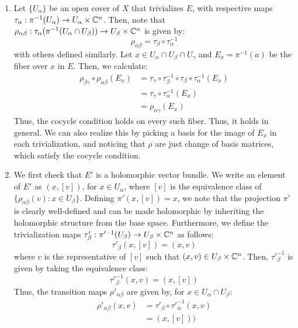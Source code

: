 \documentclass[12pt]{article}
\begin{document}
\begin{solu}
    \bbni
    \begin{enumerate}
        \item Let $\{U_\alpha\}$ be an open cover of $X$ that trivializes $E$, with respective maps $\tau_\alpha: \pi^{-1}(U_\alpha) \to U_\alpha \times \mathbb C^n$. Then, note that $\rho_{\alpha\beta}: \tau_\alpha(\pi^{-1}(U_\alpha \cap U_\beta)) \to U_\beta \times \mathbb C^n$ is given by: 
        \[\rho_{\alpha\beta} = \tau_\beta \circ \tau_\alpha^{-1}  \] 
        with others defined similarly. Let $x \in U_\alpha \cap U_\beta \cap U_\gamma$ and $E_x = \pi^{-1}(a)$ be the fiber over $x$ in $E$. Then, we calculate: 
        \begin{align*}
            \rho_{\beta\gamma} \circ \rho_{\alpha\beta}(E_x) &= \tau_\gamma \circ \tau_\beta^{-1} \circ \tau_\beta \circ \tau_\alpha^{-1}(E_x) \\
            &= \tau_\gamma \circ \tau_\alpha^{-1}(E_x) \\
            &= \rho_{\alpha\gamma}(E_x)
        \end{align*}
        Thus, the cocycle condition holds on every such fiber. Thus, it holds in general. We can also realize this by picking a basis for the image of $E_x$ in each trivialization, and noticing that $\rho$ are just change of basis matrices, which satisfy the cocycle condition. 
        \item We first check that $E'$ is a holomorphic vector bundle. We write an element of $E'$ as $(x, [v])$, for $x \in U_\alpha$, where $[v]$ is the equivalence class of $\{\rho_{\alpha\beta}(v): x \in U_\beta\}$. \bbni 
        Defining $\pi'(x, [v]) = x$, we note that the projection $\pi'$ is clearly well-defined and can be made holomorphic by inheriting the holomorphic structure from the base space. \bbni
        Furthermore, we define the trivialization maps $\tau'_\beta: \pi'^{-1}(U_\beta) \to U_\beta \times \mathbb C^n$ as follows:
        \[
            \tau'_\beta(x, [v]) = (x, v)
        \]
        where $v$ is the representative of $[v]$ such that $(x, v) \in U_\beta \times \mathbb C^n$. Then, $\tau'^{-1}_\beta$ is given by taking the equivalence class: 
        \[ \tau'^{-1}_\beta(x, v) = (x, [v]) \]
        Thus, the transition maps $\rho'_{\alpha\beta}$ are given by, for $x \in U_\alpha \cap U_\beta$:
        \begin{align*}
            \rho'_{\alpha\beta}(x, v) &= \tau'_\beta \circ \tau'^{-1}_\alpha(x, v) \\
            &= (x, [v])) \\

\end{align*}
\end{enumerate}
\end{solu}
\end{document}
